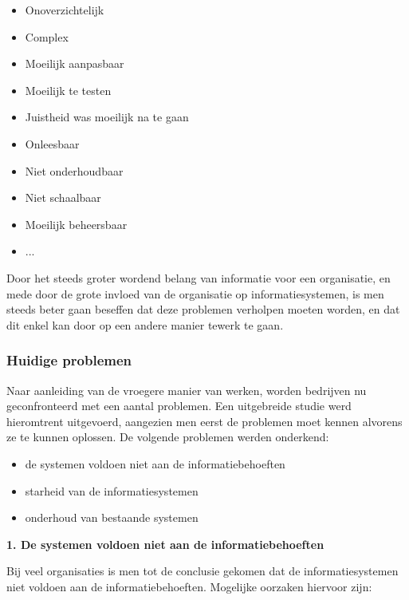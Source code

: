 \begin{itemize}
\item Onoverzichtelijk
\item Complex
\item Moeilijk aanpasbaar
\item Moeilijk te testen
\item Juistheid was moeilijk na te gaan
\item Onleesbaar
\item Niet onderhoudbaar
\item Niet schaalbaar
\item Moeilijk beheersbaar
\item ...
\end{itemize}

Door het steeds groter wordend belang van informatie voor een organisatie, en mede door de grote invloed van de organisatie op informatiesystemen, is men steeds beter gaan beseffen dat deze problemen verholpen moeten worden, en dat dit enkel kan door op een andere manier tewerk te gaan.

\subsubsection{Huidige problemen}

Naar aanleiding van de vroegere manier van werken, worden bedrijven nu geconfronteerd met een aantal problemen. Een uitgebreide studie werd hieromtrent uitgevoerd, aangezien men eerst de problemen moet kennen alvorens ze te kunnen oplossen. De volgende problemen werden onderkend:

\begin{itemize}
    \item de systemen voldoen niet aan de informatiebehoeften
    \item starheid van de informatiesystemen
    \item onderhoud van bestaande systemen
\end{itemize}

\textbf{1. De systemen voldoen niet aan de informatiebehoeften}

Bij veel organisaties is men tot de conclusie gekomen dat de informatiesystemen niet voldoen aan de informatiebehoeften. Mogelijke oorzaken hiervoor zijn:

